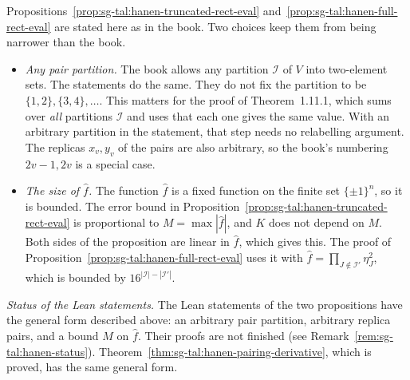 \begin{remark}\label{rem:sg-tal:hanen-general}
Propositions~\ref{prop:sg-tal:hanen-truncated-rect-eval} and~\ref{prop:sg-tal:hanen-full-rect-eval} are stated here as in the book.
Two choices keep them from being narrower than the book.
\begin{itemize}
\item \emph{Any pair partition.} The book allows any partition $\mathcal I$ of $V$ into two-element sets. The statements
 do the same. They do not fix the partition to be $\{1,2\},\{3,4\},\dots$. This matters for the proof of Theorem~1.11.1,
 which sums over \emph{all} partitions $\mathcal I$ and uses that each one gives the same value.
 With an arbitrary partition in the statement, that step needs no relabelling argument.
 The replicas $x_v,y_v$ of the pairs are also arbitrary, so the book's numbering $2v-1,2v$ is a special case.
\item \emph{The size of $\hat f$.} The function $\hat f$ is a fixed function on the finite set $\{\pm1\}^n$, so it is bounded.
 The error bound in Proposition~\ref{prop:sg-tal:hanen-truncated-rect-eval} is proportional to $M=\max|\hat f|$,
 and $K$ does not depend on $M$. Both sides of the proposition are linear in $\hat f$, which gives this.
 The proof of Proposition~\ref{prop:sg-tal:hanen-full-rect-eval} uses it with $\hat f=\prod_{J\notin\mathcal I'}\eta_J^2$, which is bounded by $16^{|\mathcal I|-|\mathcal I'|}$.
\end{itemize}
\emph{Status of the Lean statements.} The Lean statements of the two propositions have the general form described above:
an arbitrary pair partition, arbitrary replica pairs, and a bound $M$ on $\hat f$. Their proofs are not finished
(see Remark~\ref{rem:sg-tal:hanen-status}). Theorem~\ref{thm:sg-tal:hanen-pairing-derivative}, which is proved,
has the same general form.
\end{remark}

